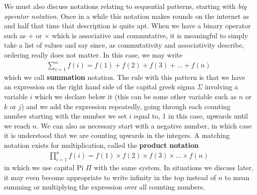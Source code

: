 \documentclass[11pt]{article}
\begin{document}
We must also discuss notations relating to sequential patterns, starting with \emph{big operator notation}. Once in a while this notation makes rounds on the internet as  and half that time that description is quite apt. When we have a binary operator such as $+$ or $\times$ which is associative and commutative, it is meaningful to simply take a list of values and say  since, as commutativity and associativity describe, ordering really does not matter. In this case, we may write \begin{gather*}
\sum_{i = 1}^n f(i) = f(1) + f(2) + f(3) + ... + f(n)
\end{gather*}
which we call \textbf{summation} notation. The rule with this pattern is that we have an expression on the right hand side of the capital greek sigma $\Sigma$ involving a variable $i$ which we declare below it (this can be some other variable such as $n$ or $k$ or $j$) and we add the expression repeatedly, going through each counting number starting with the number we set $i$ equal to, 1 in this case, upwards until we reach $n$. We can also as necessary start with a negative number, in which case it is understood that we are counting upwards in the integers. A matching notation exists for multiplication, called the \textbf{product notation} \begin{gather*}
\prod_{i=1}^n f(i) = f(1) \times f(2) \times f(3) \times ... \times f(n)
\end{gather*}
in which we use capital Pi $\Pi$ with the same system. In situations we discuss later, it may even become appropriate to write infinity in the top instead of $n$ to mean summing or multiplying the expression over all counting numbers.
\end{document}
